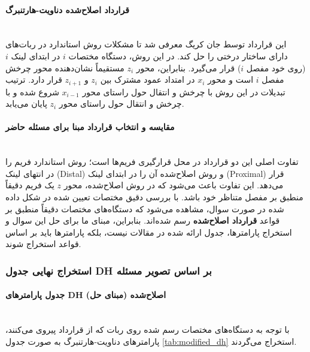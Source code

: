 \documentclass{article}
\begin{document}
\paragraph{قرارداد اصلاح‌شده دناویت-هارتنبرگ }\mbox{}\\
این قرارداد توسط جان کریگ  معرفی شد تا مشکلات روش استاندارد در ربات‌های دارای ساختار درختی را حل کند. در این روش، دستگاه مختصات $i$ در ابتدای لینک $i$ (روی خود مفصل $i$) قرار می‌گیرد. بنابراین، محور $z_i$ مستقیماً نشان‌دهنده محور چرخش مفصل $i$ است و محور $x_i$ در امتداد عمود مشترک بین $z_i$ و $z_{i+1}$ قرار دارد. ترتیب تبدیلات در این روش با چرخش و انتقال حول راستای محور $x_{i-1}$ شروع شده و با چرخش و انتقال حول راستای محور $z_i$ پایان می‌یابد.

\paragraph{مقایسه و انتخاب قرارداد مبنا برای مسئله حاضر}\mbox{}\\
تفاوت اصلی این دو قرارداد در محل قرارگیری فریم‌ها است؛ روش استاندارد فریم را در انتهای لینک (Distal) و روش اصلاح‌شده آن را در ابتدای لینک (Proximal) قرار می‌دهد. این تفاوت باعث می‌شود که در روش اصلاح‌شده، محور $z$ یک فریم دقیقاً منطبق بر مفصل متناظر خود باشد. 
با بررسی دقیق مختصات تعیین شده در شکل داده شده در صورت سوال، مشاهده می‌شود که دستگاه‌های مختصات دقیقاً منطبق بر قواعد \textbf{قرارداد اصلاح‌شده } رسم شده‌اند. بنابراین، مبنای ما برای حل این سوال و استخراج پارامترها، جدول  ارائه شده در مقالات نیست، بلکه پارامترها باید بر اساس قواعد  استخراج شوند.

\subsubsection{استخراج نهایی جدول DH بر اساس تصویر مسئله}

\paragraph{جدول پارامترهای DH اصلاح‌شده (مبنای حل)}\mbox{}\\
با توجه به دستگاه‌های مختصات رسم شده روی ربات که از قرارداد  پیروی می‌کنند، پارامترهای دناویت-هارتنبرگ به صورت جدول \ref{tab:modified_dh} استخراج می‌گردند.
\end{document}
